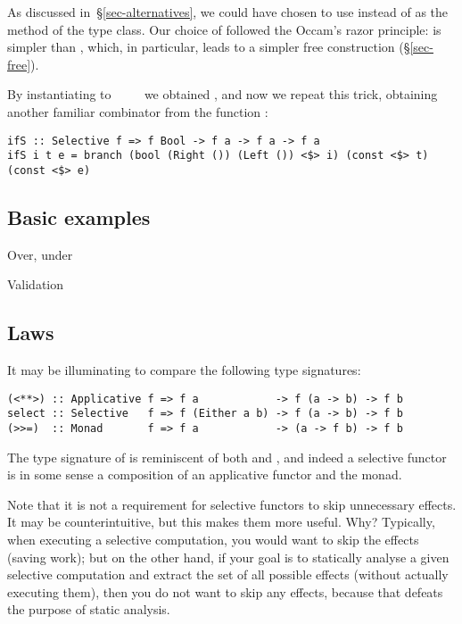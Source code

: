 As discussed in~\S\ref{sec-alternatives}, we could have chosen to use
 instead of  as the method of the  type
class. Our choice of  followed the Occam's razor principle:
 is simpler than , which, in particular, leads to a
simpler free construction (\S\ref{sec-free}).

By instantiating  to ~\hs{=}~~\hs{=}~\hs{()} we obtained
, and now we repeat this trick, obtaining another familiar combinator
 from the function :

\vspace{1mm}
\begin{verbatim}
ifS :: Selective f => f Bool -> f a -> f a -> f a
ifS i t e = branch (bool (Right ()) (Left ()) <$> i) (const <$> t) (const <$> e)
\end{verbatim}
\vspace{1mm}

\subsection{Basic examples}\label{sec-instances}

Over, under

Validation

\subsection{Laws}\label{sec-laws}

It may be illuminating to compare the following type signatures:

\begin{verbatim}
(<**>) :: Applicative f => f a            -> f (a -> b) -> f b
select :: Selective   f => f (Either a b) -> f (a -> b) -> f b
(>>=)  :: Monad       f => f a            -> (a -> f b) -> f b
\end{verbatim}

The type signature of  is reminiscent of both \hs{<*>} and \hs{>>=},
and indeed a selective functor is in some sense a composition of an applicative
functor and the  monad.


Note that it is not a requirement for selective functors to skip unnecessary
effects. It may be counterintuitive, but this makes them more useful. Why?
Typically, when executing a selective computation, you would want to skip the
effects (saving work); but on the other hand, if your goal is to statically
analyse a given selective computation and extract the set of all possible
effects (without actually executing them), then you do not want to skip any
effects, because that defeats the purpose of static analysis.

